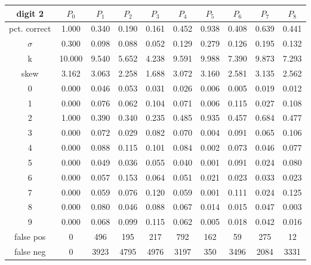 \documentclass{report}
\begin{document}
\begin{tabular}{ | c ||  c | c | c | c | c | c | c | c | c |}
 digit 2 & $P_0$ & $P_1$ & $P_2$ & $P_3$ & $P_4$ & $P_5$ & $P_6$ & $P_7$ & $P_8$ \\
\hline \hline
pct. correct  & 1.000 & 0.340 & 0.190 & 0.161 & 0.452 & 0.938 & 0.408 & 0.639 & 0.441 \\
\hline
$\sigma$ & 0.300& 0.098& 0.088& 0.052& 0.129& 0.279& 0.126& 0.195& 0.132 \\
\hline
k & 10.000& 9.540& 5.652& 4.238& 9.591& 9.988& 7.390& 9.873& 7.293 \\
\hline
skew & 3.162& 3.063& 2.258& 1.688& 3.072& 3.160& 2.581& 3.135& 2.562 \\
\hline
0 & 0.000 & 0.046 & 0.053 & 0.031 & 0.026 & 0.006 & 0.005 & 0.019 & 0.012 \\
\hline
1 & 0.000 & 0.076 & 0.062 & 0.104 & 0.071 & 0.006 & 0.115 & 0.027 & 0.108 \\
\hline
2 & 1.000 & 0.390 & 0.340 & 0.235 & 0.485 & 0.935 & 0.457 & 0.684 & 0.477 \\
\hline
3 & 0.000 & 0.072 & 0.029 & 0.082 & 0.070 & 0.004 & 0.091 & 0.065 & 0.106 \\
\hline
4 & 0.000 & 0.088 & 0.115 & 0.101 & 0.084 & 0.002 & 0.073 & 0.046 & 0.077 \\
\hline
5 & 0.000 & 0.049 & 0.036 & 0.055 & 0.040 & 0.001 & 0.091 & 0.024 & 0.080 \\
\hline
6 & 0.000 & 0.057 & 0.153 & 0.064 & 0.051 & 0.021 & 0.023 & 0.033 & 0.023 \\
\hline
7 & 0.000 & 0.059 & 0.076 & 0.120 & 0.059 & 0.001 & 0.111 & 0.024 & 0.125 \\
\hline
8 & 0.000 & 0.080 & 0.046 & 0.088 & 0.067 & 0.014 & 0.015 & 0.047 & 0.003 \\
\hline
9 & 0.000 & 0.068 & 0.099 & 0.115 & 0.062 & 0.005 & 0.018 & 0.042 & 0.016 \\
\hline
false pos  & 0 & 496 & 195 & 217 & 792 & 162 & 59 & 275 & 12 \\
\hline
false neg  & 0 & 3923 & 4795 & 4976 & 3197 & 350 & 3496 & 2084 & 3331 \\
\hline
\end{tabular}


\newpage
\end{document}
